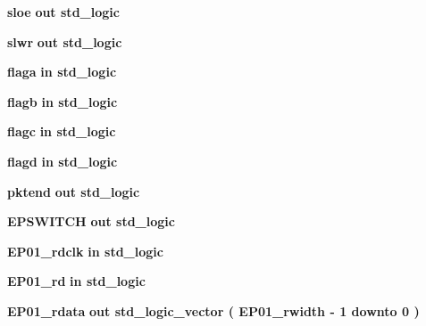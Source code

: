 \begin{DoxyCompactItemize}
\item 
{\bf sloe}  {\bfseries {\bfseries \textcolor{keywordflow}{out}\textcolor{vhdlchar}{ }}} {\bfseries \textcolor{comment}{std\+\_\+logic}\textcolor{vhdlchar}{ }} 
\item 
{\bf slwr}  {\bfseries {\bfseries \textcolor{keywordflow}{out}\textcolor{vhdlchar}{ }}} {\bfseries \textcolor{comment}{std\+\_\+logic}\textcolor{vhdlchar}{ }} 
\item 
{\bf flaga}  {\bfseries {\bfseries \textcolor{keywordflow}{in}\textcolor{vhdlchar}{ }}} {\bfseries \textcolor{comment}{std\+\_\+logic}\textcolor{vhdlchar}{ }} 
\item 
{\bf flagb}  {\bfseries {\bfseries \textcolor{keywordflow}{in}\textcolor{vhdlchar}{ }}} {\bfseries \textcolor{comment}{std\+\_\+logic}\textcolor{vhdlchar}{ }} 
\item 
{\bf flagc}  {\bfseries {\bfseries \textcolor{keywordflow}{in}\textcolor{vhdlchar}{ }}} {\bfseries \textcolor{comment}{std\+\_\+logic}\textcolor{vhdlchar}{ }} 
\item 
{\bf flagd}  {\bfseries {\bfseries \textcolor{keywordflow}{in}\textcolor{vhdlchar}{ }}} {\bfseries \textcolor{comment}{std\+\_\+logic}\textcolor{vhdlchar}{ }} 
\item 
{\bf pktend}  {\bfseries {\bfseries \textcolor{keywordflow}{out}\textcolor{vhdlchar}{ }}} {\bfseries \textcolor{comment}{std\+\_\+logic}\textcolor{vhdlchar}{ }} 
\item 
{\bf E\+P\+S\+W\+I\+T\+CH}  {\bfseries {\bfseries \textcolor{keywordflow}{out}\textcolor{vhdlchar}{ }}} {\bfseries \textcolor{comment}{std\+\_\+logic}\textcolor{vhdlchar}{ }} 
\item 
{\bf E\+P01\+\_\+rdclk}  {\bfseries {\bfseries \textcolor{keywordflow}{in}\textcolor{vhdlchar}{ }}} {\bfseries \textcolor{comment}{std\+\_\+logic}\textcolor{vhdlchar}{ }} 
\item 
{\bf E\+P01\+\_\+rd}  {\bfseries {\bfseries \textcolor{keywordflow}{in}\textcolor{vhdlchar}{ }}} {\bfseries \textcolor{comment}{std\+\_\+logic}\textcolor{vhdlchar}{ }} 
\item 
{\bf E\+P01\+\_\+rdata}  {\bfseries {\bfseries \textcolor{keywordflow}{out}\textcolor{vhdlchar}{ }}} {\bfseries \textcolor{comment}{std\+\_\+logic\+\_\+vector}\textcolor{vhdlchar}{ }\textcolor{vhdlchar}{(}\textcolor{vhdlchar}{ }\textcolor{vhdlchar}{ }\textcolor{vhdlchar}{ }\textcolor{vhdlchar}{ }{\bfseries {\bf E\+P01\+\_\+rwidth}} \textcolor{vhdlchar}{-\/}\textcolor{vhdlchar}{ } \textcolor{vhdldigit}{1} \textcolor{vhdlchar}{ }\textcolor{keywordflow}{downto}\textcolor{vhdlchar}{ }\textcolor{vhdlchar}{ } \textcolor{vhdldigit}{0} \textcolor{vhdlchar}{ }\textcolor{vhdlchar}{)}\textcolor{vhdlchar}{ }} 

\end{DoxyCompactItemize}
